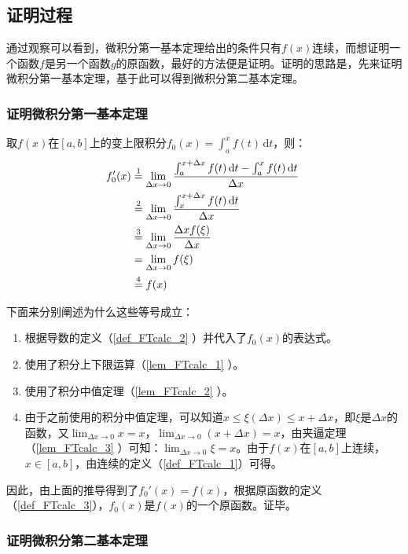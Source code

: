 \subsection{证明过程}

通过观察可以看到，微积分第一基本定理给出的条件只有$f(x)$连续，而想证明一个函数$f$是另一个函数$g$的原函数，最好的方法便是证明。证明的思路是，先来证明微积分第一基本定理，基于此可以得到微积分第二基本定理。

\subsubsection{证明微积分第一基本定理}

取$f(x)$在$[a,b]$上的变上限积分$f_0(x)=\int_{a}^{x} f(t)\, \mathrm {d}t$，则：
$$\begin{align*}f_0'(x) &\overset{\mathrm{1}}{=} \lim_{\Delta x\to0}{\int_{a}^{x+\Delta x} f(t)\, \mathrm {d}t-\int_{a}^{x} f(t)\, \mathrm {d}t\over\Delta x}\\ 
&\overset{\mathrm{2}}{=}\lim_{\Delta x\to0}{\int_{x}^{x+\Delta x} f(t)\, \mathrm {d}t\over\Delta x}\\
&\overset{\mathrm{3}}{=}\lim_{\Delta x\to0}{\Delta xf(\xi)\over\Delta x} \\ 
&=\lim_{\Delta x\to0}f(\xi)\\ 
&\overset{\mathrm{4}}{=}f(x)\end{align*}~$$

下面来分别阐述为什么这些等号成立：
\begin{enumerate}
\item 根据导数的定义（\autoref{def_FTcalc_2} ）并代入了$f_0(x)$的表达式。
\item 使用了积分上下限运算（\autoref{lem_FTcalc_1} ）。
\item 使用了积分中值定理（\autoref{lem_FTcalc_2} ）。
\item 由于之前使用的积分中值定理，可以知道$x\leq\xi(\Delta x)\leq x+\Delta x$，即$\xi$是$\Delta x$的函数，又$\lim_{\Delta x\to0}x=x$，$\lim_{\Delta x\to0}(x+\Delta x)=x$，由夹逼定理（\autoref{lem_FTcalc_3} ）可知：$\lim_{\Delta x\to0}\xi=x$。由于$f(x)$在$[a,b]$上连续，$x\in[a,b]$，由连续的定义（\autoref{def_FTcalc_1}）可得。
\end{enumerate}

因此，由上面的推导得到了$f_0'(x)=f(x)$，根据原函数的定义（\autoref{def_FTcalc_3}），$f_0(x)$是$f(x)$的一个原函数。证毕。

\subsubsection{证明微积分第二基本定理}


